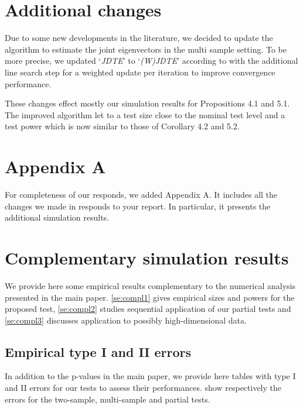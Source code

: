 \documentclass[12pt]{article}
\numberwithin{equation}{section}
\numberwithin{table}{section}
\numberwithin{thm}{section}
\numberwithin{defn}{section}
\numberwithin{lem}{section}
\numberwithin{prop}{section}
\numberwithin{cor}{section}
\numberwithin{rem}{section}
\begin{document}
\section*{Additional changes}
Due to some new developments in the literature, we decided to update the algorithm to estimate the joint eigenvectors in the multi sample setting. To be more precise, we updated `\textit{JDTE}' to `\textit{(W)JDTE}' according to \cite{andre} with the additional line search step for a weighted update per iteration to improve convergence performance.

These changes effect mostly our simulation results for Propositions 4.1 and 5.1. The improved algorithm let to a test size close to the nominal test level and a test power which is now similar to those of Corollary 4.2 and 5.2.



\section*{Appendix A}
\appendix
For completeness of our responds, we added Appendix A. It includes all the changes we made in responds to your report. In particular, it presents the additional simulation results.

\section{Complementary simulation results} \label{se:compl}
We provide here some empirical results complementary to the numerical analysis presented in the main paper. \autoref{se:compl1} gives empirical sizes and powers for the proposed test, 
\autoref{se:compl2} studies sequential application of our partial tests and \autoref{se:compl3} discusses application to possibly high-dimensional data.

\subsection{Empirical type I and II errors} \label{se:compl1}
In addition to the p-values in the main paper, we provide here tables with type I and II errors for our tests to assess their performances.  show respectively the errors for the two-sample, multi-sample and partial tests.
\end{document}
